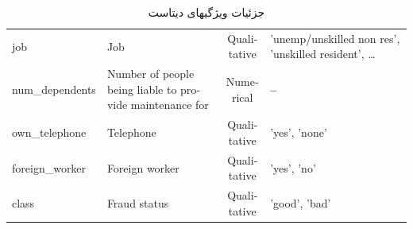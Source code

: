 \documentclass[journal]{IEEEtran}
\newcommand{\نیمفاصله}{\halfspace}
\renewcommand{\ }{\halfspace}
\newcommand{\وکا}{\lr{WEKA} }
\newcommand{\ار}{\lr{R} }
\renewcommand{\|}[1][.3em]{\hspace{#1}|\hspace{#1}}
\renewcommand{\,}[1][.3em]{,\hspace{#1}}
\begin{document}
\begin{table}[ht]
\begin{latin}
\begin{adjustwidth}{-.34in}{0in}
\begin{tabular}{l|l|c|l}
job & Job & Qualitative & \footnotesize{'unemp/unskilled non res'\, 'unskilled resident'\, \ldots}\\
num\_dependents & Number of people being liable to provide maintenance for & Numerical & \textbf{--} \\
own\_telephone & Telephone & Qualitative & \footnotesize{'yes'\, 'none'}\\
foreign\_worker & Foreign worker & Qualitative & \footnotesize{'yes'\, 'no'}\\
class & Fraud status & Qualitative & \footnotesize{'good'\, 'bad'}\\
\end{tabular}
\end{adjustwidth}
\end{latin}
\caption{جزئیات ویژگی\ های دیتاست\cite{DATASET:GERMAN}}\label{tbl:EDA:attribs}
\end{table}
\end{document}
